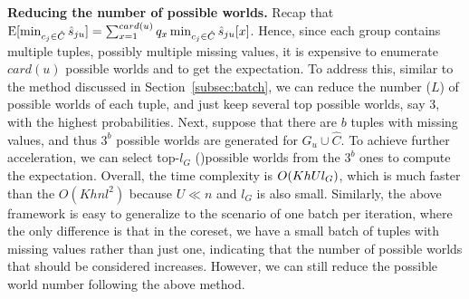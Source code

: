 \noindent \textbf{Reducing the number of possible worlds.} Recap that $\mathrm{E}[\min_{c_j\in \hat {C}}\hat{s}_{ju}] = \sum_{x=1}^{card(u)} q_x \min_{c_j \in \hat{C}} \hat{s}_{ju}[x]$.
%
 Hence, since each group contains multiple tuples, possibly multiple missing values,  it is expensive to enumerate $card(u)$ possible worlds and  to get the expectation. 
 To address this, similar to the method discussed in
 Section~\ref{subsec:batch},  we can reduce the number ($L$) of possible worlds of each tuple, and just keep several top possible worlds, say 3, with the highest probabilities. Next, suppose that there are $b$ tuples with missing values, and thus $3^b$ possible worlds are generated for $G_u \cup \hat{C}$. To achieve further acceleration,   we can  select top-$l_G$ ()possible worlds from the $3^b$ ones to compute the expectation. Overall, the time complexity is $O(KhUl_{G})$, which is much faster than the $O(Khnl^2)$ because $U \ll n$ and $l_G$ is also small. Similarly, the above framework is easy to generalize to the scenario of one batch per iteration, where the only difference is that in the coreset, we have a small batch of tuples with missing values rather than just one, indicating that the number of possible worlds that should be considered increases. However, we can still reduce the possible world number following the above method. 
 
 
 
